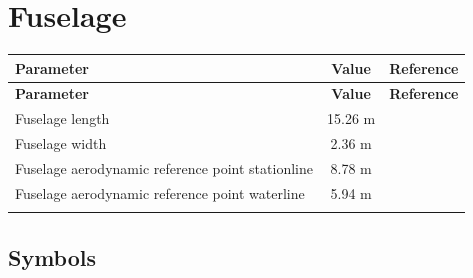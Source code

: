\section{Fuselage}

\begin{tabularx}{\textwidth}{ | L | c | c | }
  \hline
  \textbf{Parameter}                    & \textbf{Value}   & \textbf{Reference} \\ \hline
  \endfirsthead
  \hline
  \textbf{Parameter}                    & \textbf{Value}   & \textbf{Reference} \\ \hline
  \endhead
  Fuselage length                       & 15.26 m          & \cite{Janes20042005,NASA-CR-166309} \\ \hline
  Fuselage width                        & 2.36 m           & \cite{UH60_OperatorsManual,Janes20042005} \\ \hline
  Fuselage aerodynamic reference point stationline & 8.78 m & \cite{NASA-CR-166309,NASA-TM-85890} \\ \hline
  Fuselage aerodynamic reference point waterline   & 5.94 m & \cite{NASA-CR-166309,NASA-TM-85890} \\ \hline
  \caption{Fuselage data}
\end{tabularx}


\clearpage
\subsection{Symbols}


